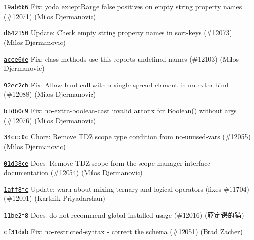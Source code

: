\begin{DoxyItemize}
\item \href{https://github.com/eslint/eslint/commit/19ab6666e8e4142a183bdee2be96e5bafbac0e21}{\texttt{ {\ttfamily 19ab666}}} Fix\+: yoda except\+Range false positives on empty string property names (\#12071) (Milos Djermanovic)
\item \href{https://github.com/eslint/eslint/commit/d642150fe016608e71a1df2a72960e915b3cfbad}{\texttt{ {\ttfamily d642150}}} Update\+: Check empty string property names in sort-\/keys (\#12073) (Milos Djermanovic)
\item \href{https://github.com/eslint/eslint/commit/acce6de940e2b089ff5ba59e4518a54af1682d5e}{\texttt{ {\ttfamily acce6de}}} Fix\+: class-\/methods-\/use-\/this reports \textquotesingle{}undefined\textquotesingle{} names (\#12103) (Milos Djermanovic)
\item \href{https://github.com/eslint/eslint/commit/92ec2cb1731b7b6e0ac66336d583fbb782504290}{\texttt{ {\ttfamily 92ec2cb}}} Fix\+: Allow bind call with a single spread element in no-\/extra-\/bind (\#12088) (Milos Djermanovic)
\item \href{https://github.com/eslint/eslint/commit/bfdb0c97003fc0e045aa6ed10b177c35305a6e46}{\texttt{ {\ttfamily bfdb0c9}}} Fix\+: no-\/extra-\/boolean-\/cast invalid autofix for Boolean() without args (\#12076) (Milos Djermanovic)
\item \href{https://github.com/eslint/eslint/commit/34ccc0cd81f495190e585c6efa8ae233d45bd3ed}{\texttt{ {\ttfamily 34ccc0c}}} Chore\+: Remove TDZ scope type condition from no-\/unused-\/vars (\#12055) (Milos Djermanovic)
\item \href{https://github.com/eslint/eslint/commit/01d38ce2faf0abbc9dd5d25694baeee131036165}{\texttt{ {\ttfamily 01d38ce}}} Docs\+: Remove TDZ scope from the scope manager interface documentation (\#12054) (Milos Djermanovic)
\item \href{https://github.com/eslint/eslint/commit/1aff8fc4f9394cd9126654a55f7f3a43ab1cf8f0}{\texttt{ {\ttfamily 1aff8fc}}} Update\+: warn about mixing ternary and logical operators (fixes \#11704) (\#12001) (Karthik Priyadarshan)
\item \href{https://github.com/eslint/eslint/commit/11be2f8513bd61499f6247392a33ac0a26901c90}{\texttt{ {\ttfamily 11be2f8}}} Docs\+: do not recommend global-\/installed usage (\#12016) (薛定谔的猫)
\item \href{https://github.com/eslint/eslint/commit/cf31dab5d5982151e0cfcc32879e69a83180ec70}{\texttt{ {\ttfamily cf31dab}}} Fix\+: no-\/restricted-\/syntax -\/ correct the schema (\#12051) (Brad Zacher)

\end{DoxyItemize}
